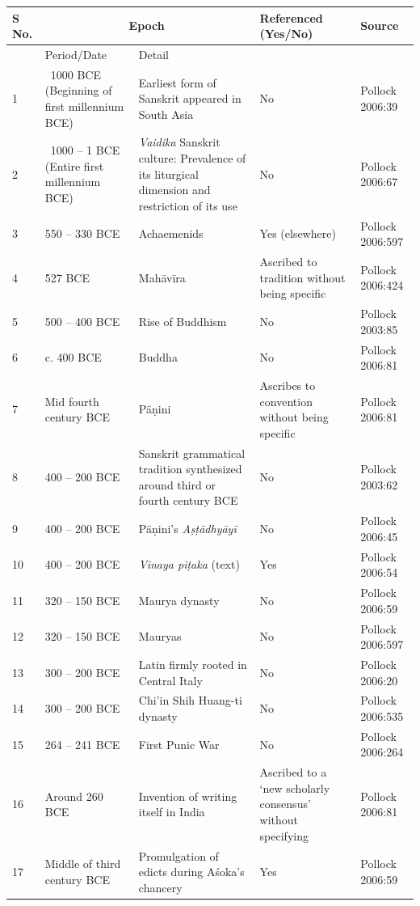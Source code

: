 \begin{longtable}{|l|p{1.9cm}|p{1.9cm}|p{1.6cm}|p{1.6cm}|}
\hline
S No. & \multicolumn{2}{c|}{Epoch} & Referenced (Yes/No) & Source \\
\hline
 & Period/Date & Detail &  &  \\
\hline
1 & ~1000 BCE (Beginning of first millennium BCE) & Earliest form of Sanskrit appeared in South Asia & No & Pollock 2006:39 \\
\hline
2 & ~1000 – 1 BCE (Entire first millennium BCE) & \textit{Vaidika} Sanskrit culture: Prevalence of its liturgical dimension and restriction of its use & No & Pollock 2006:67 \\
\hline
3 & 550 – 330 BCE & Achaemenids & Yes (elsewhere) & Pollock 2006:597 \\
\hline
4 & 527 BCE & Mahāvīra & Ascribed to tradition without being specific & Pollock 2006:424 \\
\hline
5 & 500 – 400 BCE & Rise of Buddhism & No & Pollock 2003:85 \\
\hline
6 & c. 400 BCE & Buddha & No & Pollock 2006:81 \\
\hline
7 & Mid fourth century BCE & Pāṇini & Ascribes to convention without being specific & Pollock 2006:81 \\
\hline
8 & 400 – 200 BCE & Sanskrit grammatical tradition synthesized around third or fourth century BCE & No & Pollock 2003:62 \\
\hline
9 & 400 – 200 BCE & Pāṇini’s \textit{Aṣṭādhyāyī} & No & Pollock 2006:45 \\
\hline
10 & 400 – 200 BCE & \textit{Vinaya piṭaka} (text) & Yes & Pollock 2006:54 \\
\hline
11 & 320 – 150 BCE & Maurya dynasty & No & Pollock 2006:59 \\
\hline
12 & 320 – 150 BCE & Mauryas & No & Pollock 2006:597 \\
\hline
13 & 300 – 200 BCE & Latin firmly rooted in Central Italy & No & Pollock 2006:20 \\
\hline
14 & 300 – 200 BCE & Chi’in Shih Huang-ti dynasty & No & Pollock 2006:535 \\
\hline
15 & 264 – 241 BCE & First Punic War & No & Pollock 2006:264 \\
\hline
16 & Around 260 BCE & Invention of writing itself in India & Ascribed to a ‘new scholarly consensus’ without specifying & Pollock 2006:81 \\
\hline
17 & Middle of third century BCE & Promulgation of edicts during Aśoka’s chancery & Yes & Pollock 2006:59 \\

\end{longtable}
